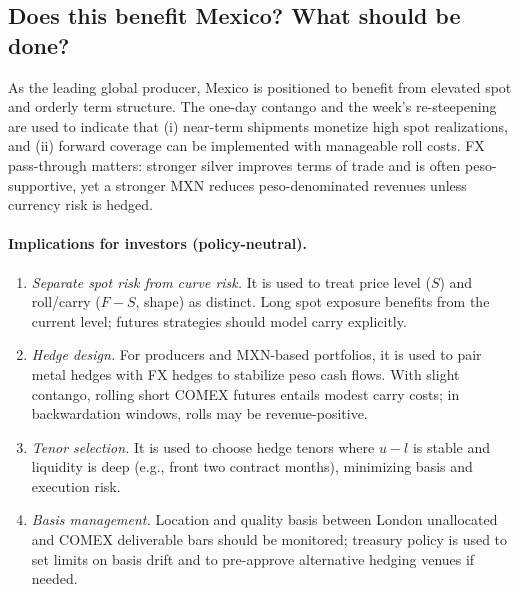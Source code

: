 \documentclass[11pt,a4paper]{article} %
\begin{document}
\subsection{Does this benefit Mexico? What should be done?}

As the leading global producer, Mexico is positioned to benefit from elevated spot and orderly term structure. The one-day contango and the week's re-steepening are used to indicate that (i) near-term shipments monetize high spot realizations, and (ii) forward coverage can be implemented with manageable roll costs. FX pass-through matters: stronger silver improves terms of trade and is often peso-supportive, yet a stronger MXN reduces peso-denominated revenues unless currency risk is hedged.

\paragraph{Implications for investors (policy-neutral).}
\begin{enumerate}
  \item \textit{Separate spot risk from curve risk.} It is used to treat price level (\(S\)) and roll/carry (\(F-S\), shape) as distinct. Long spot exposure benefits from the current level; futures strategies should model carry explicitly.
  \item \textit{Hedge design.} For producers and MXN-based portfolios, it is used to pair metal hedges with FX hedges to stabilize peso cash flows. With slight contango, rolling short COMEX futures entails modest carry costs; in backwardation windows, rolls may be revenue-positive.
  \item \textit{Tenor selection.} It is used to choose hedge tenors where \(u-l\) is stable and liquidity is deep (e.g., front two contract months), minimizing basis and execution risk.
  \item \textit{Basis management.} Location and quality basis between London unallocated and COMEX deliverable bars should be monitored; treasury policy is used to set limits on basis drift and to pre-approve alternative hedging venues if needed.
\end{enumerate}
\end{document}
